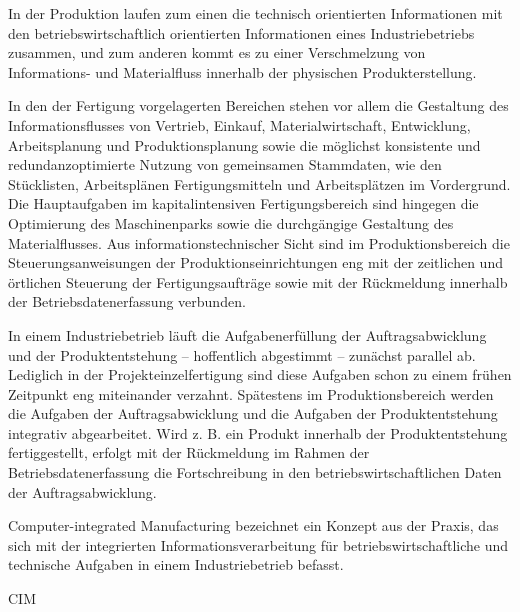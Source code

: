 In der Produktion laufen zum einen die technisch orientierten Informationen mit den betriebswirtschaftlich orientierten Informationen eines Industriebetriebs zusammen, und zum anderen kommt es zu einer Verschmelzung von Informations- und Materialfluss innerhalb der physischen Produkterstellung.

In den der Fertigung vorgelagerten Bereichen stehen vor allem die Gestaltung des Informationsflusses von Vertrieb, Einkauf, Materialwirtschaft, Entwicklung, Arbeitsplanung und Produktionsplanung sowie die möglichst konsistente und redundanzoptimierte Nutzung von gemeinsamen Stammdaten, wie den Stücklisten, Arbeitsplänen Fertigungsmitteln und Arbeitsplätzen im Vordergrund. Die Hauptaufgaben im kapitalintensiven Fertigungsbereich sind hingegen die Optimierung des Maschinenparks sowie die durchgängige Gestaltung des Materialflusses. Aus informationstechnischer Sicht sind im Produktionsbereich die Steuerungsanweisungen der Produktionseinrichtungen eng mit der zeitlichen und örtlichen Steuerung der Fertigungsaufträge sowie mit der Rückmeldung innerhalb der Betriebsdatenerfassung verbunden.










In einem Industriebetrieb läuft die Aufgabenerfüllung der Auftragsabwicklung und der Produktentstehung – hoffentlich abgestimmt – zunächst parallel ab. Lediglich in der Projekteinzelfertigung sind diese Aufgaben schon zu einem frühen Zeitpunkt eng miteinander verzahnt. Spätestens im Produktionsbereich werden die Aufgaben der Auftragsabwicklung und die Aufgaben der Produktentstehung integrativ abgearbeitet. Wird z. B. ein Produkt innerhalb der Produktentstehung fertiggestellt, erfolgt mit der Rückmeldung im Rahmen der Betriebsdatenerfassung die Fortschreibung in den betriebswirtschaftlichen Daten der Auftragsabwicklung. 

Computer-integrated Manufacturing bezeichnet ein Konzept aus der Praxis, das sich mit der integrierten Informationsverarbeitung für betriebswirtschaftliche und technische Aufgaben in einem Industriebetrieb befasst. 

\cite{Scheer.1990} CIM







